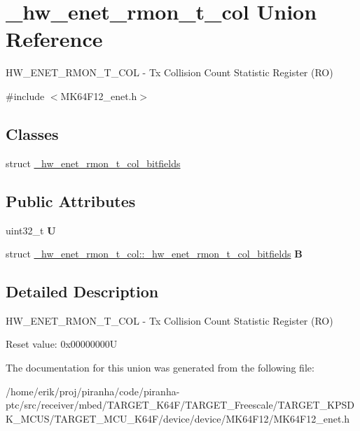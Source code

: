 \hypertarget{union__hw__enet__rmon__t__col}{}\section{\+\_\+hw\+\_\+enet\+\_\+rmon\+\_\+t\+\_\+col Union Reference}
\label{union__hw__enet__rmon__t__col}


H\+W\+\_\+\+E\+N\+E\+T\+\_\+\+R\+M\+O\+N\+\_\+\+T\+\_\+\+C\+OL -\/ Tx Collision Count Statistic Register (RO)  




{\ttfamily \#include $<$M\+K64\+F12\+\_\+enet.\+h$>$}

\subsection*{Classes}
\begin{DoxyCompactItemize}
\item 
struct \hyperlink{struct__hw__enet__rmon__t__col_1_1__hw__enet__rmon__t__col__bitfields}{\+\_\+hw\+\_\+enet\+\_\+rmon\+\_\+t\+\_\+col\+\_\+bitfields}
\end{DoxyCompactItemize}
\subsection*{Public Attributes}
\begin{DoxyCompactItemize}
\item 
uint32\+\_\+t {\bfseries U}\hypertarget{union__hw__enet__rmon__t__col_acf7863f6494da27a9ad91d582476b8ef}{}\label{union__hw__enet__rmon__t__col_acf7863f6494da27a9ad91d582476b8ef}

\item 
struct \hyperlink{struct__hw__enet__rmon__t__col_1_1__hw__enet__rmon__t__col__bitfields}{\+\_\+hw\+\_\+enet\+\_\+rmon\+\_\+t\+\_\+col\+::\+\_\+hw\+\_\+enet\+\_\+rmon\+\_\+t\+\_\+col\+\_\+bitfields} {\bfseries B}\hypertarget{union__hw__enet__rmon__t__col_a0eb41f41b3a8f43f4d1a56175878ee0e}{}\label{union__hw__enet__rmon__t__col_a0eb41f41b3a8f43f4d1a56175878ee0e}

\end{DoxyCompactItemize}


\subsection{Detailed Description}
H\+W\+\_\+\+E\+N\+E\+T\+\_\+\+R\+M\+O\+N\+\_\+\+T\+\_\+\+C\+OL -\/ Tx Collision Count Statistic Register (RO) 

Reset value\+: 0x00000000U 

The documentation for this union was generated from the following file\+:\begin{DoxyCompactItemize}
\item 
/home/erik/proj/piranha/code/piranha-\/ptc/src/receiver/mbed/\+T\+A\+R\+G\+E\+T\+\_\+\+K64\+F/\+T\+A\+R\+G\+E\+T\+\_\+\+Freescale/\+T\+A\+R\+G\+E\+T\+\_\+\+K\+P\+S\+D\+K\+\_\+\+M\+C\+U\+S/\+T\+A\+R\+G\+E\+T\+\_\+\+M\+C\+U\+\_\+\+K64\+F/device/device/\+M\+K64\+F12/M\+K64\+F12\+\_\+enet.\+h\end{DoxyCompactItemize}
